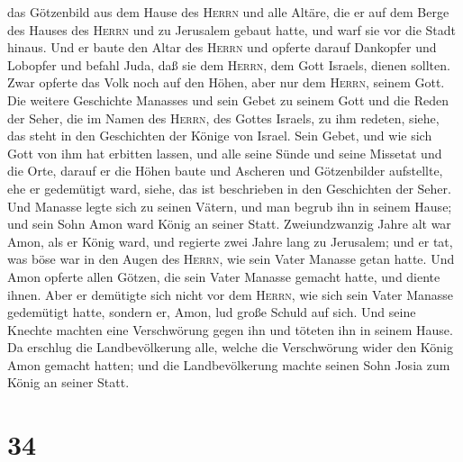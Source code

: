 das Götzenbild aus dem Hause des \textsc{Herrn} und alle Altäre, die er
auf dem Berge des Hauses des \textsc{Herrn} und zu Jerusalem gebaut
hatte, und warf sie vor die Stadt hinaus.  Und er baute
den Altar des \textsc{Herrn} und opferte darauf Dankopfer und Lobopfer
und befahl Juda, daß sie dem \textsc{Herrn}, dem Gott Israels, dienen
sollten.  Zwar opferte das Volk noch auf den Höhen, aber
nur dem \textsc{Herrn}, seinem Gott.  Die weitere
Geschichte Manasses und sein Gebet zu seinem Gott und die Reden der
Seher, die im Namen des \textsc{Herrn}, des Gottes Israels, zu ihm
redeten, siehe, das steht in den Geschichten der Könige von Israel.
 Sein Gebet, und wie sich Gott von ihm hat erbitten
lassen, und alle seine Sünde und seine Missetat und die Orte, darauf er
die Höhen baute und Ascheren und Götzenbilder aufstellte, ehe er
gedemütigt ward, siehe, das ist beschrieben in den Geschichten der
Seher.  Und Manasse legte sich zu seinen Vätern, und man
begrub ihn in seinem Hause; und sein Sohn Amon ward König an seiner
Statt.  Zweiundzwanzig Jahre alt war Amon, als er König
ward, und regierte zwei Jahre lang zu Jerusalem;  und er
tat, was böse war in den Augen des \textsc{Herrn}, wie sein Vater
Manasse getan hatte. Und Amon opferte allen Götzen, die sein Vater
Manasse gemacht hatte, und diente ihnen.  Aber er
demütigte sich nicht vor dem \textsc{Herrn}, wie sich sein Vater Manasse
gedemütigt hatte, sondern er, Amon, lud große Schuld auf sich.
 Und seine Knechte machten eine Verschwörung gegen ihn
und töteten ihn in seinem Hause.  Da erschlug die
Landbevölkerung alle, welche die Verschwörung wider den König Amon
gemacht hatten; und die Landbevölkerung machte seinen Sohn Josia zum
König an seiner Statt.

\hypertarget{section-33}{%
\section{34}\label{section-33}}

